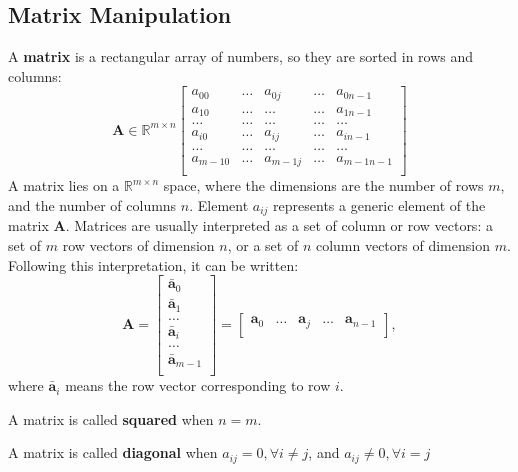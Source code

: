 \subsection{Matrix Manipulation}
A \textbf{matrix} is a rectangular array of numbers, so they are sorted in rows and columns:
\begin{equation}
\mathbf{A} \in \mathbb{R}^{m \times n}
\left[
\begin{array}{ccccc}
  a_{00} & \dots & a_{0j} & \dots & a_{0n-1} \\
  a_{10} & \dots & \dots & \dots & a_{1n-1} \\
  \dots & \dots & \dots & \dots & \dots \\
  a_{i0} & \dots & a_{ij} & \dots & a_{in-1} \\
  \dots & \dots & \dots & \dots & \dots \\
  a_{m-10} & \dots & a_{m-1j} & \dots & a_{m-1n-1} \\
\end{array}
\right]
\end{equation}
A matrix lies on a $\mathbb{R}^{m \times n}$ space, where the dimensions are the number of rows $m$, and the number of columns $n$. Element $a_{ij}$ represents a generic element of the matrix $\mathbf{A}$. Matrices are usually interpreted as a set of column or row vectors: a set of $m$ row vectors of dimension $n$, or a set of $n$ column vectors of dimension $m$. Following this interpretation, it can be written: 
\begin{equation}
\mathbf{A} = 
\left[
\begin{array}{c}
  \bar{\mathbf{a}}_0 \\
  \bar{\mathbf{a}}_1 \\
  \dots \\
  \bar{\mathbf{a}}_i \\
  \dots \\
  \bar{\mathbf{a}}_{m-1} \\
\end{array}
\right]
 = 
\left[
\begin{array}{ccccc}
  \mathbf{a}_0 & \dots & \mathbf{a}_j & \dots & \mathbf{a}_{n-1} \\
\end{array}
\right], 
\end{equation}
where $\bar{\mathbf{a}}_i$ means the row vector corresponding to row $i$. 

A matrix is called \textbf{squared} when $n=m$.

A matrix is called \textbf{diagonal} when $a_{ij}=0, \forall i\neq j$, and $a_{ij}\neq0, \forall i=j$

